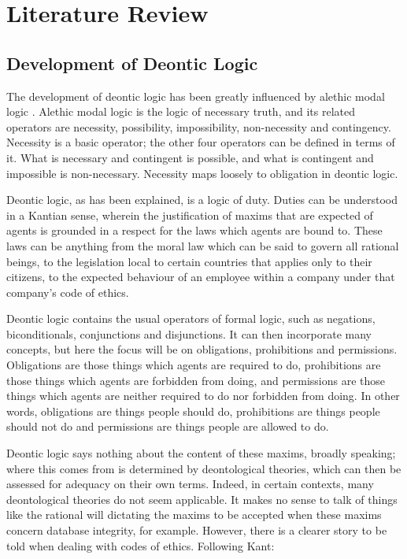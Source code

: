 \documentclass{l4proj}
\begin{document}
\chapter{Literature Review}

\section{Development of Deontic Logic}%
The development of deontic logic has been greatly influenced by alethic modal logic \cite{sep-logic-deontic}. Alethic modal logic is the logic of necessary truth, and its related operators are necessity, possibility, impossibility, non-necessity and contingency. Necessity is a basic operator; the other four operators can be defined in terms of it. What is necessary and contingent is possible, and what is contingent and impossible is non-necessary. Necessity maps loosely to obligation in deontic logic. 

Deontic logic, as has been explained, is a logic of duty. Duties can be understood in a Kantian sense, wherein the justification of maxims that are expected of agents is grounded in a respect for the laws which agents are bound to\cite{sep-kant-moral}. These laws can be anything from the moral law which can be said to govern all rational beings, to the legislation local to certain countries that applies only to their citizens, to the expected behaviour of an employee within a company under that company's code of ethics. 

Deontic logic contains the usual operators of formal logic, such as negations, biconditionals, conjunctions and disjunctions. It can then incorporate many concepts, but here the focus will be on obligations, prohibitions and permissions. Obligations are those things which agents are required to do, prohibitions are those things which agents are forbidden from doing, and permissions are those things which agents are neither required to do nor forbidden from doing. In other words, obligations are things people should do, prohibitions are things people should not do and permissions are things people are allowed to do. 

Deontic logic says nothing about the content of these maxims, broadly speaking; where this comes from is determined by deontological theories, which can then be assessed for adequacy on their own terms. Indeed, in certain contexts, many deontological theories do not seem applicable. It makes no sense to talk of things like the rational will dictating the maxims to be accepted when these maxims concern database integrity, for example. However, there is a clearer story to be told when dealing with codes of ethics. Following Kant\cite{groundwork}: 
\end{document}

